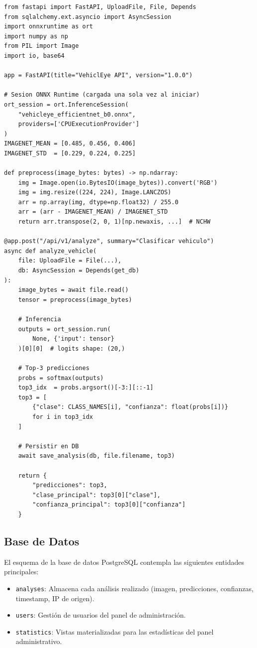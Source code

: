 \documentclass[12pt,a4paper]{article}
\begin{document}
\begin{lstlisting}[caption={Endpoint principal de clasificación en FastAPI}, label={lst:apiendpoint}]
from fastapi import FastAPI, UploadFile, File, Depends
from sqlalchemy.ext.asyncio import AsyncSession
import onnxruntime as ort
import numpy as np
from PIL import Image
import io, base64

app = FastAPI(title="VehiclEye API", version="1.0.0")

# Sesion ONNX Runtime (cargada una sola vez al iniciar)
ort_session = ort.InferenceSession(
    "vehicleye_efficientnet_b0.onnx",
    providers=['CPUExecutionProvider']
)
IMAGENET_MEAN = [0.485, 0.456, 0.406]
IMAGENET_STD  = [0.229, 0.224, 0.225]

def preprocess(image_bytes: bytes) -> np.ndarray:
    img = Image.open(io.BytesIO(image_bytes)).convert('RGB')
    img = img.resize((224, 224), Image.LANCZOS)
    arr = np.array(img, dtype=np.float32) / 255.0
    arr = (arr - IMAGENET_MEAN) / IMAGENET_STD
    return arr.transpose(2, 0, 1)[np.newaxis, ...]  # NCHW

@app.post("/api/v1/analyze", summary="Clasificar vehiculo")
async def analyze_vehicle(
    file: UploadFile = File(...),
    db: AsyncSession = Depends(get_db)
):
    image_bytes = await file.read()
    tensor = preprocess(image_bytes)

    # Inferencia
    outputs = ort_session.run(
        None, {'input': tensor}
    )[0][0]  # logits shape: (20,)

    # Top-3 predicciones
    probs = softmax(outputs)
    top3_idx  = probs.argsort()[-3:][::-1]
    top3 = [
        {"clase": CLASS_NAMES[i], "confianza": float(probs[i])}
        for i in top3_idx
    ]

    # Persistir en DB
    await save_analysis(db, file.filename, top3)

    return {
        "predicciones": top3,
        "clase_principal": top3[0]["clase"],
        "confianza_principal": top3[0]["confianza"]
    }
\end{lstlisting}

\subsection{Base de Datos}

El esquema de la base de datos PostgreSQL contempla las siguientes entidades principales:

\begin{itemize}
    \item \texttt{analyses}: Almacena cada análisis realizado (imagen, predicciones, confianzas, timestamp, IP de origen).
    \item \texttt{users}: Gestión de usuarios del panel de administración.
    \item \texttt{statistics}: Vistas materializadas para las estadísticas del panel administrativo.
\end{itemize}
\end{document}

